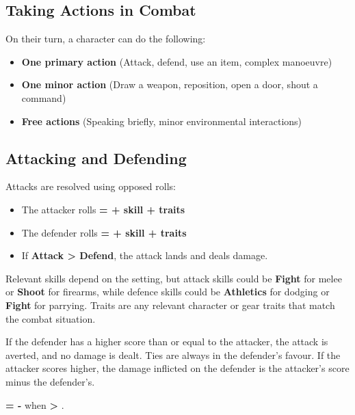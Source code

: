 \subsection{Taking Actions in Combat}

On their turn, a character can do the following:
\begin{itemize}
    \item \textbf{One primary action} (Attack, defend, use an item, complex manoeuvre)
    \item \textbf{One minor action} (Draw a weapon, reposition, open a door, shout a command)
    \item \textbf{Free actions} (Speaking briefly, minor environmental interactions)
\end{itemize}

\subsection{Attacking and Defending}

Attacks are resolved using opposed rolls:
\begin{WyrdExplanation}
	\begin{itemize}
    	\item The attacker rolls \textbf{\Attack = \FudgeRoll + skill + traits}
	    \item The defender rolls \textbf{\Defend = \FudgeRoll + skill + traits} 	    
	    \item If \textbf{Attack > Defend}, the attack lands and deals damage.
	\end{itemize}
\end{WyrdExplanation}

Relevant skills depend on the setting, but attack skills could be \textbf{Fight} for melee or \textbf{Shoot} for firearms, while defence skills could be \textbf{Athletics} for dodging or \textbf{Fight} for parrying. Traits are any relevant character or gear traits that match the combat situation.

If the defender has a higher score than or equal to the attacker, the attack is averted, and no damage is dealt. Ties are always in the defender's favour. If the attacker scores higher, the damage inflicted on the defender is the attacker's score minus the defender's.

\begin{WyrdExplanation}
    \textbf{\Damage = \Attack - \Defend} when \textbf{\Attack > \Defend}.
\end{WyrdExplanation}

